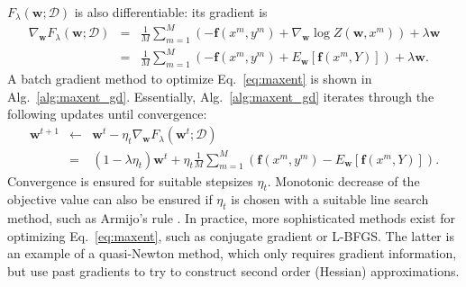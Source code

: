 $F_{\lambda}(\boldsymbol{w}; \mathcal{D})$ is also differentiable: its gradient is 
\begin{eqnarray}
\nabla_{\boldsymbol{w}}F_{\lambda}(\boldsymbol{w}; \mathcal{D}) &=& \frac{1}{M}\sum_{m=1}^M (-\boldsymbol{f}(x^m,y^m) + \nabla_{\boldsymbol{w}} \log Z(\boldsymbol{w},x^m))
+ \lambda \boldsymbol{w} \nonumber\\
&=& \frac{1}{M}\sum_{m=1}^M (-\boldsymbol{f}(x^m,y^m) + E_{\boldsymbol{w}} [\boldsymbol{f}(x^m,Y)])
+ \lambda \boldsymbol{w}. 
\end{eqnarray}
A batch gradient method to optimize Eq.~\ref{eq:maxent} is shown in Alg.~\ref{alg:maxent_gd}. Essentially, Alg.~\ref{alg:maxent_gd} iterates 
through the following updates until convergence: 
\begin{eqnarray}
\boldsymbol{w}^{t+1} &\leftarrow&  \boldsymbol{w}^{t} - \eta_t \nabla_{\boldsymbol{w}}F_{\lambda}(\boldsymbol{w}^{t}; \mathcal{D})\nonumber\\
&=&  (1-\lambda \eta_t) \boldsymbol{w}^{t} + \eta_t \frac{1}{M} \sum_{m=1}^M \left( \boldsymbol{f}(x^m,y^m) - E_{\boldsymbol{w}}[\boldsymbol{f}(x^m,Y)]\right).
\end{eqnarray}
Convergence is ensured for suitable stepsizes $\eta_t$. Monotonic decrease of the objective value can also be ensured if $\eta_t$ is chosen 
with a suitable line search method, such as Armijo's rule \citep{Nocedal1999}. 
In practice, more sophisticated methods exist for optimizing Eq.~\ref{eq:maxent}, such as conjugate gradient or L-BFGS. The latter is an 
example of a quasi-Newton method, which only requires gradient information, but use past 
gradients to try to 
construct second order (Hessian) approximations. 

